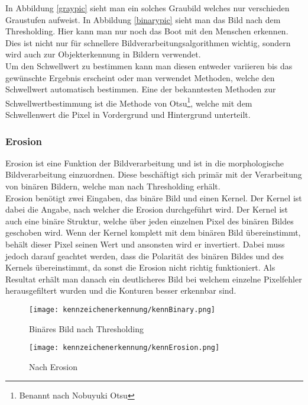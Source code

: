 In Abbildung \ref{graypic} sieht man ein solches Graubild welches nur verschieden Graustufen aufweist. In Abbildung \ref{binarypic} sieht man das 
Bild nach dem Thresholding. Hier kann man nur noch das Boot mit den Menschen erkennen. Dies ist nicht nur für schnellere 
Bildverarbeitungsalgorithmen wichtig, sondern wird auch zur Objekterkennung in Bildern verwendet.\\

Um den Schwellwert zu bestimmen kann man diesen entweder variieren bis das gewünschte Ergebnis erscheint oder man 
verwendet Methoden, welche den Schwellwert automatisch bestimmen. Eine der bekanntesten Methoden zur Schwellwertbestimmung 
ist die Methode von Otsu\footnote{Benannt nach Nobuyuki Otsu}, welche mit dem Schwellenwert die Pixel in Vordergrund und Hintergrund unterteilt.

\subsubsection{Erosion}
Erosion ist eine Funktion der Bildverarbeitung und ist in die morphologische Bildverarbeitung einzuordnen. Diese beschäftigt 
sich primär mit der Verarbeitung von binären Bildern, welche man nach Thresholding erhält.\\

Erosion benötigt zwei Eingaben, das binäre Bild und einen Kernel. Der Kernel ist dabei die Angabe, nach welcher die Erosion 
durchgeführt wird. Der Kernel ist auch eine binäre Struktur, welche über jeden einzelnen Pixel des binären Bildes geschoben 
wird. Wenn der Kernel komplett mit dem binären Bild übereinstimmt, behält dieser Pixel seinen Wert und ansonsten wird er 
invertiert. Dabei muss jedoch darauf geachtet werden, dass die Polarität des binären Bildes und des Kernels übereinstimmt, 
da sonst die Erosion nicht richtig funktioniert. Als Resultat erhält man danach ein deutlicheres Bild bei welchem einzelne 
Pixelfehler herausgefiltert wurden und die Konturen besser erkennbar sind.\\

\begin{figure}[htbp]
    \centering
    \begin{minipage}[t]{0.45\linewidth}
        \centering
        \texttt{[image: kennzeichenerkennung/kennBinary.png]}
        \caption{Binäres Bild nach Thresholding}
        \label{kennbinpic}
    \end{minipage}
    \hfill
    \begin{minipage}[t]{0.45\linewidth}
        \centering
        \texttt{[image: kennzeichenerkennung/kennErosion.png]}
        \caption{Nach Erosion}
        \label{eropic}
    \end{minipage}
\end{figure}

